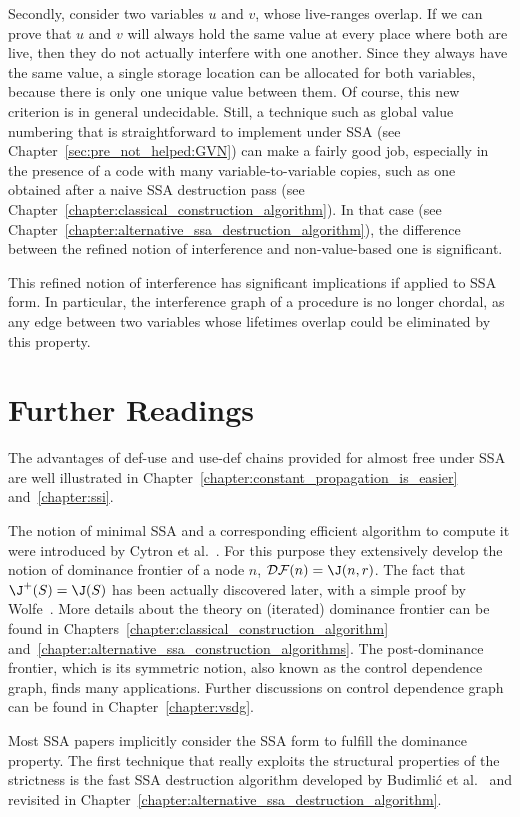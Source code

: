Secondly, consider two variables $u$ and $v$, whose live-ranges overlap. 
If we can prove that $u$ and $v$ will always hold the same value at every place where both are live, then they do not actually interfere with one another. 
Since they always have the same value, a single storage location can be allocated for both variables, because there is only one unique value between them. 
Of course, this new criterion is in general undecidable. 
Still, a technique such as global value numbering that is straightforward to implement under SSA (see Chapter~\ref{sec:pre_not_helped:GVN}) can make a fairly good job, especially in the presence of a code with many variable-to-variable copies, such as one obtained after a naive SSA destruction pass (see Chapter~\ref{chapter:classical_construction_algorithm}). 
In that case (see Chapter~\ref{chapter:alternative_ssa_destruction_algorithm}), the difference between the refined notion of interference and non-value-based one is significant.

This refined notion of interference has significant implications if applied to SSA form. 
In particular, the interference graph of a procedure is no longer chordal, as any edge between two variables whose lifetimes overlap could be eliminated by this property.


\section{Further Readings}
The advantages of def-use and use-def chains provided for almost free under SSA are well illustrated in Chapter\ifconstantprop~\ref{chapter:constant_propagation_is_easier} and\fi~\ref{chapter:ssi}.

The notion of minimal SSA and a corresponding efficient algorithm to compute it were introduced by Cytron et al.~\cite{CytronOct91}. 
For this purpose they extensively develop the notion of dominance frontier of a node $n$, ${\cal DF}(n)=\J(n,r)$. 
The fact that $\J^+(S)=\J(S)$ has been actually discovered later, with a simple proof by Wolfe~\cite{WolfeJul94}. 
More details about the theory on (iterated) dominance frontier can be found in Chapters~\ref{chapter:classical_construction_algorithm} and~\ref{chapter:alternative_ssa_construction_algorithms}. 
The post-dominance frontier, which is its symmetric notion, also known as the control dependence graph, finds many applications. 
Further discussions on control dependence graph can be found in Chapter~\ref{chapter:vsdg}.

Most SSA papers implicitly consider the SSA form to fulfill the dominance property. 
The first technique that really exploits the structural properties of the strictness is the fast SSA destruction algorithm developed by Budimli\'c et al.~\cite{BudimlicJun02} and revisited in Chapter~\ref{chapter:alternative_ssa_destruction_algorithm}.

